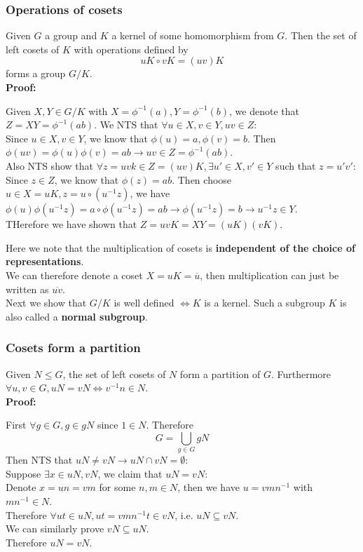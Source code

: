 \documentclass{article}
\begin{document}
\subsubsection*{Operations of cosets}
Given $G$ a group and $K$ a kernel of some homomorphism from $G$. Then the set of left cosets of $K$ with operations defined by
\begin{equation*}
    uK \circ vK = (uv)K
\end{equation*}
forms a group $G/K$.\\
\textbf{Proof:}
\begin{addmargin}[1em]{0em}
    Given $X, Y \in G/K$ with $X = \phi^{-1}(a), Y = \phi^{-1}(b)$, we denote that $Z = XY = \phi^{-1}(ab)$. We NTS that $\forall u \in X, v \in Y, uv \in Z$:\\
    Since $u \in X, v \in Y$, we know that $\phi(u) = a, \phi(v) = b$. Then $\phi(uv) = \phi(u)\phi(v) = ab \rightarrow uv \in Z = \phi^{-1}(ab)$.\\
    Also NTS show that $\forall z = uvk \in Z = (uv)K, \exists u' \in X, v' \in Y$ such that $z = u'v'$:\\
    Since $z \in Z$, we know that $\phi(z) = ab$. Then choose $u \in X = uK, z = u \circ (u^{-1}z)$, we have\\
    $\phi(u)\phi(u^{-1}z) = a \circ \phi(u^{-1}z) = ab \rightarrow \phi(u^{-1}z) = b \rightarrow u^{-1}z \in Y$.\\
    THerefore we have shown that $Z = uvK = XY = (uK)(vK)$.
\end{addmargin}
Here we note that the multiplication of cosets is \textbf{independent of the choice of representations}.\\
We can therefore denote a coset $X = uK = \overline{u}$, then multiplication can just be written as $\overline{uv}$.\\
Next we show that $G/K$ is well defined $\iff K$ is a kernel. Such a subgroup $K$ is also called a \textbf{normal subgroup}.
\subsubsection*{Cosets form a partition}
Given $N \leq G$, the set of left cosets of $N$ form a partition of $G$. Furthermore $\forall u, v \in G, uN = vN \iff v^{-1}n \in N$.\\
\textbf{Proof:}
\begin{addmargin}[1em]{0em}
    First $\forall g \in G, g \in gN$ since $1 \in N$. Therefore
    \begin{equation*}
        G = \bigcup_{g \in G} gN
    \end{equation*}
    Then NTS that $uN \neq vN \rightarrow uN \cap vN = \emptyset$:\\
    Suppose $\exists x \in uN, vN$, we claim that $uN = vN$:\\
    Denote $x = un = vm$ for some $n, m \in N$, then we have $u = vmn^{-1}$ with $mn^{-1} \in N$.\\
    Therefore $\forall ut \in uN, ut = vmn^{-1}t \in vN$, i.e. $uN \subseteq vN$.\\
    We can similarly prove $vN \subseteq uN$.\\
    Therefore $uN = vN$.
\end{addmargin}
\end{document}
